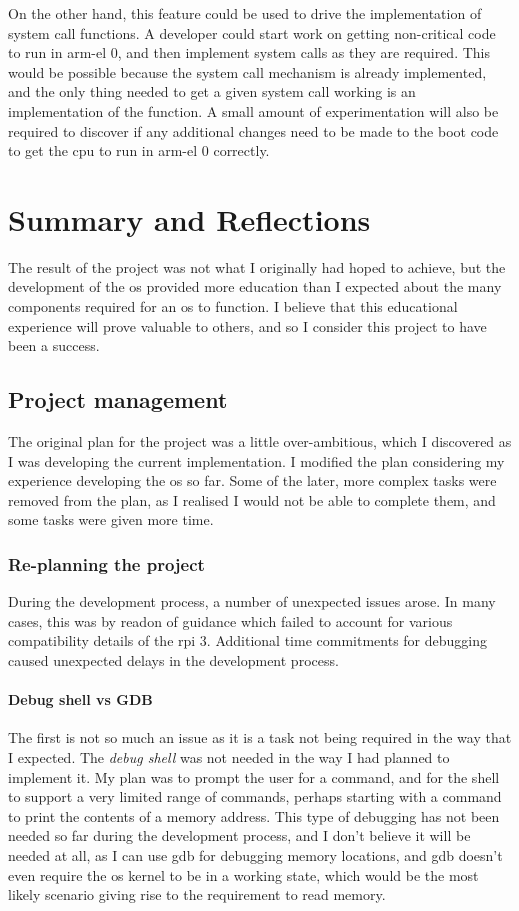 \documentclass{article}
\begin{document}
On the other hand, this feature could be used to drive the implementation of
system call functions. A developer could start work on getting non-critical
code to run in \gls{arm-el} 0, and then implement system calls as they are
required. This would be possible because the system call mechanism is already
implemented, and the only thing needed to get a given system call working is an
implementation of the function. A small amount of experimentation will also be
required to discover if any additional changes need to be made to the boot code
to get the \gls{cpu} to run in \gls{arm-el} 0 correctly.

\section{Summary and Reflections}
The result of the project was not what I originally had hoped to achieve, but
the development of the \gls{os} provided more education than I expected about
the many components required for an \gls{os} to function. I believe that this
educational experience will prove valuable to others, and so I consider this
project to have been a success.

\subsection{Project management}
The original plan for the project was a little over-ambitious, which I
discovered as I was developing the current implementation. I modified the plan
considering my experience developing the \gls{os} so far. Some of the later,
more complex tasks were removed from the plan, as I realised I would not be
able to complete them, and some tasks were given more time.

\subsubsection{Re-planning the project}
During the development process, a number of unexpected issues arose. In many
cases, this was by readon of guidance which failed to account for various
compatibility details of the \gls{rpi} 3. Additional time commitments for
debugging caused unexpected delays in the development process.

\paragraph{Debug shell vs GDB}
The first is not so much an issue as it is a task not being required in the way
that I expected. The \emph{debug shell} was not needed in the way I had planned
to implement it. My plan was to prompt the user for a command, and for the
shell to support a very limited range of commands, perhaps starting with a
command to print the contents of a memory address. This type of debugging has
not been needed so far during the development process, and I don't believe it
will be needed at all, as I can use \gls{gdb} for debugging memory locations,
and \gls{gdb} doesn't even require the \gls{os} kernel to be in a working
state, which would be the most likely scenario giving rise to the requirement
to read memory.
\end{document}
